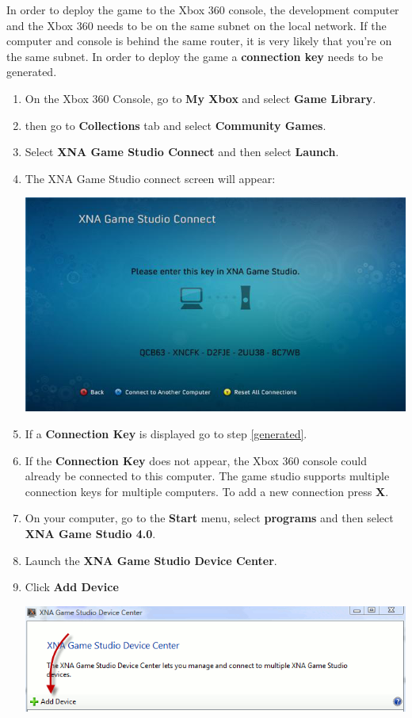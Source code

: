 In order to deploy the game to the Xbox 360 console, the development computer and the Xbox 360 needs to be on the same subnet on the local network. If the computer and console is behind the same router, it is very likely that you're on the same subnet. In order to deploy the game a \textbf{connection key} needs to be generated. \\

\begin{enumerate}
	\item On the Xbox 360 Console, go to \textbf{My Xbox} and select \textbf{Game Library}. 
	\item then go to \textbf{Collections} tab and select \textbf{Community Games}. 
	\item Select \textbf{XNA Game Studio Connect} and then select \textbf{Launch}. 
	\item The XNA Game Studio connect screen will appear: \\ \begin{center}\includegraphics[scale=0.5]{graphics/connect}\end{center}
	\item If a \textbf{Connection Key} is displayed go to step \ref{generated}. 
	\item If the \textbf{Connection Key} does not appear, the Xbox 360 console could already be connected to this computer. The game studio supports multiple connection keys for multiple computers. To add a new connection press \textbf{X}. 
	\item \label{generated} On your computer, go to the \textbf{Start} menu, select \textbf{programs} and then select \textbf{XNA Game Studio 4.0}. 
	\item Launch the \textbf{XNA Game Studio Device Center}.
	\item Click \textbf{Add Device} \\ \begin{center}\includegraphics[scale=0.75]{graphics/add_device}\end{center} 

\end{enumerate}
